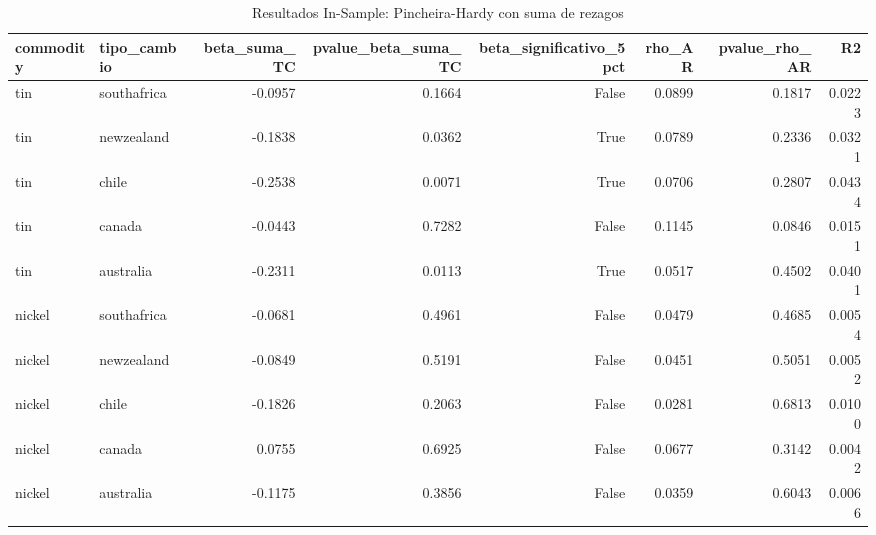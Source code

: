 \begin{table}
\caption{Resultados In-Sample: Pincheira-Hardy con suma de rezagos}
\label{tab:res_h}
\begin{tabular}{llrrrrrr}
\toprule
commodity & tipo_cambio & beta_suma_TC & pvalue_beta_suma_TC & beta_significativo_5pct & rho_AR & pvalue_rho_AR & R2 \\
\midrule
tin & southafrica & -0.0957 & 0.1664 & False & 0.0899 & 0.1817 & 0.0223 \\
tin & newzealand & -0.1838 & 0.0362 & True & 0.0789 & 0.2336 & 0.0321 \\
tin & chile & -0.2538 & 0.0071 & True & 0.0706 & 0.2807 & 0.0434 \\
tin & canada & -0.0443 & 0.7282 & False & 0.1145 & 0.0846 & 0.0151 \\
tin & australia & -0.2311 & 0.0113 & True & 0.0517 & 0.4502 & 0.0401 \\
nickel & southafrica & -0.0681 & 0.4961 & False & 0.0479 & 0.4685 & 0.0054 \\
nickel & newzealand & -0.0849 & 0.5191 & False & 0.0451 & 0.5051 & 0.0052 \\
nickel & chile & -0.1826 & 0.2063 & False & 0.0281 & 0.6813 & 0.0100 \\
nickel & canada & 0.0755 & 0.6925 & False & 0.0677 & 0.3142 & 0.0042 \\
nickel & australia & -0.1175 & 0.3856 & False & 0.0359 & 0.6043 & 0.0066 \\
\bottomrule
\end{tabular}
\end{table}
